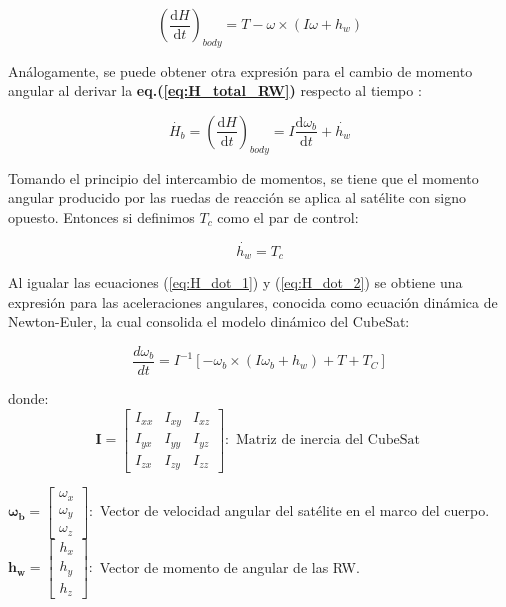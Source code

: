   \begin{equation}\label{eq:H_dot_1}
 	 \left(\frac{\mathrm{d} H}{\mathrm{d} t}\right)_{body} = T-\omega \times \left(I\omega + h_w\right) 	
 \end{equation}
 
 Análogamente, se puede obtener otra expresión para el cambio de momento angular al derivar la \textbf{eq.(\ref{eq:H_total_RW})} respecto al tiempo :
 
 \begin{equation}\label{eq:H_dot_2}
 	\dot{H_b} = \left(\frac{\mathrm{d} H}{\mathrm{d} t}\right)_{body} = 
 	I\frac{\mathrm{d} \omega_b}{\mathrm{d} t} + \dot{h_w}  	
 \end{equation}
 
Tomando el principio del intercambio de momentos, se tiene que el momento angular producido por las ruedas de reacción se aplica al satélite con signo opuesto. Entonces si definimos $T_c$ como el par de control:

\begin{equation}\label{eq:torque_h}
	\dot{h_w} = T_c  	
\end{equation}

Al igualar las ecuaciones (\ref{eq:H_dot_1}) y (\ref{eq:H_dot_2}) se obtiene una expresión para las aceleraciones angulares, conocida como ecuación dinámica de Newton-Euler, la cual consolida el modelo dinámico del CubeSat:


\begin{equation}\label{eq:modelo_dinamico}
	\frac{d \omega_b}{d t}=I^{-1}\left[-\omega_b \times\left(I \omega_b+h_w\right)+T+T_C\right]	
\end{equation}

donde:
$$
\mathbf{I}=\left[\begin{array}{ccc}
	I_{x x} & I_{x y} & I_{x z} \\
	I_{y x} & I_{y y} & I_{y z} \\
	I_{z x} & I_{z y} & I_{z z}
\end{array}\right]:\text { Matriz de inercia del CubeSat }
$$

$\mathbf{\omega_b}=\left[\begin{array}{l}\omega_x \\ \omega_y \\ \omega_z\end{array}\right]:$ Vector de velocidad angular del satélite en el marco del cuerpo.\\[5pt]	

$\mathbf{h_w}=\left[\begin{array}{l}h_x \\ h_y \\ h_z\end{array}\right]:$ Vector de momento de angular de las RW.\\[10pt]	

